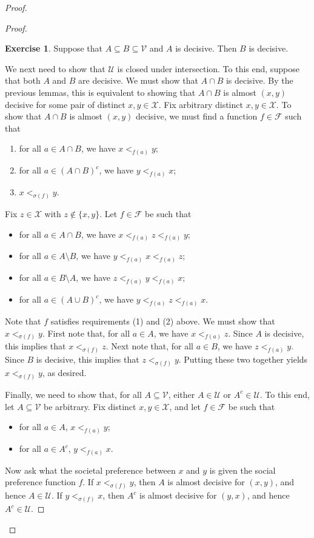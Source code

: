 \documentclass[a4paper]{memoir}
\theoremstyle{definition}
\newtheorem{exercise}[theorem]{Exercise}
\newcommand{\mc}{\mathcal}
\begin{document}
\begin{proof}
\begin{proof}
    \begin{exercise}
      Suppose that $A \subseteq B \subseteq \mc{V}$ and $A$ is decisive. Then $B$ is decisive.
    \end{exercise}
    
    We next need to show that $\mc{U}$ is closed under intersection. To this end, suppose that 
    both $A$ and $B$ are decisive. We must show that $A \cap B$ is decisive. By the previous 
    lemmas, this is equivalent to showing that $A \cap B$ is almost $(x,y)$ decisive for 
    some pair of distinct $x,y \in \mc{X}$. Fix arbitrary distinct $x,y \in \mc{X}$. To show 
    that $A \cap B$ is almost $(x,y)$ decisive, we must find a function $f \in \mc{F}$ such that
    \begin{enumerate}
      \item for all $a \in A \cap B$, we have $x <_{f(a)} y$;
      \item for all $a \in (A \cap B)^c$, we have $y <_{f(a)} x$;
      \item $x <_{\sigma(f)} y$.
    \end{enumerate}
    Fix $z \in \mc{X}$ with $z \notin \{x,y\}$. Let $f \in \mc{F}$ be such that
    \begin{itemize}
      \item for all $a \in A \cap B$, we have $x <_{f(a)} z <_{f(a)} y$;
      \item for all $a \in A \setminus B$, we have $y <_{f(a)} x <_{f(a)} z$;
      \item for all $a \in B \setminus A$, we have $z <_{f(a)} y <_{f(a)} x$;
      \item for all $a \in (A \cup B)^c$, we have $y < _{f(a)} z <_{f(a)} x$.
    \end{itemize}
    Note that $f$ satisfies requirements (1) and (2) above. We must show that $x <_{\sigma(f)} y$.
    First note that, for all $a \in A$, we have $x <_{f(a)} z$. Since $A$ is decisive, this 
    implies that $x <_{\sigma(f)} z$. Next note that, for all $a \in B$, we have $z <_{f(a)} y$. 
    Since $B$ is decisive, this implies that $z <_{\sigma(f)} y$. Putting these two together 
    yields $x <_{\sigma(f)} y$, as desired.
  
    Finally, we need to show that, for all $A \subseteq \mc{V}$, either $A \in \mc{U}$ or $A^c \in \mc{U}$. 
    To this end, let $A \subseteq \mc{V}$ be arbitrary. Fix distinct $x,y \in \mc{X}$, and let 
    $f \in \mc{F}$ be such that
    \begin{itemize}
      \item for all $a \in A$, $x <_{f(a)} y$;
      \item for all $a \in A^c$, $y <_{f(a)} x$.
    \end{itemize}
    Now ask what the societal preference between $x$ and $y$ is given the social preference function 
    $f$. If $x <_{\sigma(f)} y$, then $A$ is almost decisive for $(x,y)$, and hence $A \in \mc{U}$. 
    If $y <_{\sigma(f)} x$, then $A^c$ is almost decisive for $(y,x)$, and hence $A^c \in \mc{U}$.
  \end{proof}
  

\end{proof}
\end{document}
